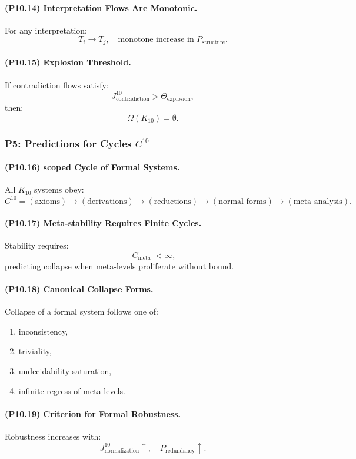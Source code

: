 \paragraph{(P10.14) Interpretation Flows Are Monotonic.}
For any interpretation:
\[
T_i \to T_j,
\quad
\text{monotone increase in } P_{\mathrm{structure}}.
\]

\paragraph{(P10.15) Explosion Threshold.}
If contradiction flows satisfy:
\[
J_{\mathrm{contradiction}}^{10} > \Theta_{\mathrm{explosion}},
\]
then:
\[
\Omega(K_{10}) = \emptyset.
\]

\subsubsection{P5: Predictions for Cycles $C^{10}$}

\paragraph{(P10.16) scoped Cycle of Formal Systems.}
All $K_{10}$ systems obey:
\[
C^{10} = 
(\text{axioms}) \to (\text{derivations}) \to 
(\text{reductions}) \to (\text{normal forms}) \to 
(\text{meta-analysis}).
\]

\paragraph{(P10.17) Meta-stability Requires Finite Cycles.}
Stability requires:
\[
|C_{\mathrm{meta}}| < \infty,
\]
predicting collapse when meta-levels proliferate without bound.

\paragraph{(P10.18) Canonical Collapse Forms.}
Collapse of a formal system follows one of:
\begin{enumerate}
    \item inconsistency,
    \item triviality,
    \item undecidability saturation,
    \item infinite regress of meta-levels.
\end{enumerate}

\paragraph{(P10.19) Criterion for Formal Robustness.}
Robustness increases with:
\[
J_{\mathrm{normalization}}^{10} \uparrow,
\quad 
P_{\mathrm{redundancy}} \uparrow.
\]

